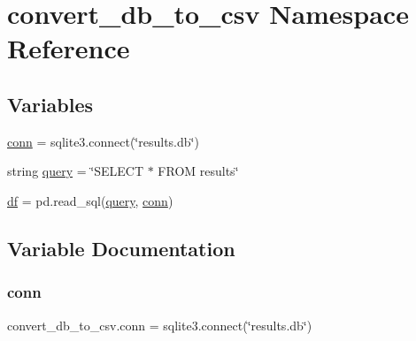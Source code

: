 \hypertarget{namespaceconvert__db__to__csv}{}\section{convert\+\_\+db\+\_\+to\+\_\+csv Namespace Reference}
\label{namespaceconvert__db__to__csv}
\subsection*{Variables}
\begin{DoxyCompactItemize}
\item 
\hyperlink{namespaceconvert__db__to__csv_a9341f766302a5eb3bec8a9635d370dda}{conn} = sqlite3.\+connect(\char`\"{}results.\+db\char`\"{})
\item 
string \hyperlink{namespaceconvert__db__to__csv_a5d57a3f656148bd4ee88527913ded9dc}{query} = \char`\"{}S\+E\+L\+E\+CT $\ast$ F\+R\+OM results\char`\"{}
\item 
\hyperlink{namespaceconvert__db__to__csv_ada5ed00455affb802a435c9e05c77919}{df} = pd.\+read\+\_\+sql(\hyperlink{namespaceconvert__db__to__csv_a5d57a3f656148bd4ee88527913ded9dc}{query}, \hyperlink{namespaceconvert__db__to__csv_a9341f766302a5eb3bec8a9635d370dda}{conn})
\end{DoxyCompactItemize}


\subsection{Variable Documentation}
\mbox{\label{namespaceconvert__db__to__csv_a9341f766302a5eb3bec8a9635d370dda}} 
\subsubsection{\texorpdfstring{conn}{conn}}
{\footnotesize\ttfamily convert\+\_\+db\+\_\+to\+\_\+csv.\+conn = sqlite3.\+connect(\char`\"{}results.\+db\char`\"{})}

\mbox{\label{namespaceconvert__db__to__csv_ada5ed00455affb802a435c9e05c77919}} 
